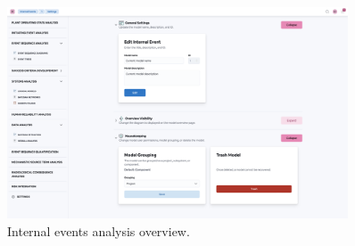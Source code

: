 \begin{figure}[h!]
  \centering
  \includegraphics[width=0.9\textwidth]{4_proposed_solution/web_app/figures/analysis_modes_types.png}
  \caption{Internal events analysis overview.}
  \label{fig:analysis_modes_types}
\end{figure}
